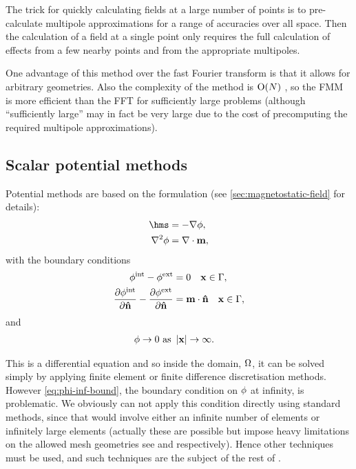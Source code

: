 The trick for quickly calculating fields at a large number of points is to pre-calculate multipole approximations for a range of accuracies over all space.
Then the calculation of a field at a single point only requires the full calculation of effects from a few nearby points and from the appropriate multipoles.

One advantage of this method over the fast Fourier transform is that it allows for arbitrary geometries.
Also the complexity of the method is $\mathrm{O}{\left( N \right)}$ \cite{Chang2011}, so the FMM is more efficient than the FFT for sufficiently large problems (although ``sufficiently large'' may in fact be very large due to the cost of precomputing the required multipole approximations).


\subsection{Scalar potential methods}
\label{sec:magstat-field-calc-pote}

Potential methods are based on the formulation (see \cref{sec:magnetostatic-field} for details):
\begin{equation}
  \begin{aligned}
    \label{eq:Hms2}
    \hms &= - \grad \phim, \\
    \lap \phim &= \div \mv,
  \end{aligned}
\end{equation}
with the boundary conditions
\begin{equation}
  \begin{aligned}
    \label{eq:cont-phi-bound2}
    \phi^{\mathrm{int}} - \phi^{\mathrm{ext}} &= 0 \quad \boldsymbol{\mathrm{x}} \in {\Gamma}, \\
    \frac{\partial \phi^{\mathrm{int}}}{\partial \boldsymbol{\mathrm{\hat{n}}}} - \frac{\partial \phi^{\mathrm{ext}}}{\partial \boldsymbol{\mathrm{\hat{n}}}} &= \boldsymbol{\mathrm{m}} \cdot \boldsymbol{\mathrm{\hat{n}}} \quad \boldsymbol{\mathrm{x}} \in {\Gamma}, \\
  \end{aligned}
\end{equation}
and
\begin{equation}
  \begin{aligned}
    \label{eq:phi-inf-bound}
    \phi \rightarrow 0 \text{ as } &\left|{\boldsymbol{\mathrm{x}}} \right| \rightarrow \infty.
  \end{aligned}
\end{equation}

This is a differential equation and so inside the domain, $\Omega$, it can be solved simply by applying finite element or finite difference discretisation methods.
However \cref{eq:phi-inf-bound}, the boundary condition on $\phi$ at infinity, is problematic.
We obviously can not apply this condition directly using standard methods, since that would involve either an infinite number of elements or infinitely large elements (actually these are  possible but impose heavy limitations on the allowed mesh geometries see \eg \cite{Alouges2001} and \cite{Fidler2000} respectively).
Hence other techniques must be used, and such techniques are the subject of the rest of .

